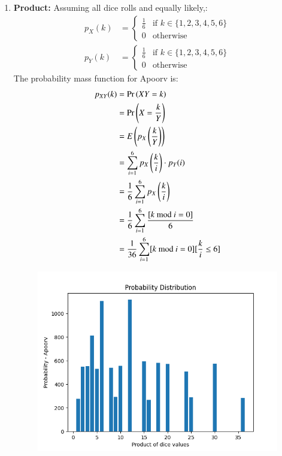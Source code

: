 \documentclass[journal,12pt,twocolumn]{IEEEtran}
\theoremstyle{remark}
\begin{document}
\begin{enumerate}
    \item \textbf{Product:} Assuming all dice rolls and equally likely,:
\begin{align}
    p_X(k) &= 
    \begin{cases}
        \frac{1}{6} & \text{if }k \in \{1, 2, 3, 4, 5, 6\}\\
        0 & \text{otherwise}
    \end{cases}\label{eq:1}\\
    p_Y(k) &=
    \begin{cases}
        \frac{1}{6} & \text{if }k \in \{1, 2, 3, 4, 5, 6\}\\
        0 & \text{otherwise}
    \end{cases}
\end{align}
The probability mass function for Apoorv is:
\begin{align}
    p_{XY}(k) &= \Pr\left(XY = k\right)\\
    &= \Pr\left(X = \frac{k}{Y}\right)\\
    &= E\left(p_X\left(\frac{k}{Y}\right)\right)\\
    &= \sum_{i = 1}^{6} p_X\left(\frac{k}{i}\right) \cdot p_Y(i)\\
    &= \frac{1}{6} \sum_{i = 1}^{6} p_X\left(\frac{k}{i}\right)\\
    &= \frac{1}{6} \sum_{i = 1}^{6} \frac{[k \text{ mod } i = 0]}{6}\\
    &= \frac{1}{36} \sum_{i = 1}^{6} [k \text{ mod } i = 0][\frac{k}{i} \leq 6]
\end{align}
\begin{figure}[h!]
    \includegraphics[width=\columnwidth]{plots/PDF - Apoorv.png}

\end{figure}
\end{enumerate}
\end{document}
